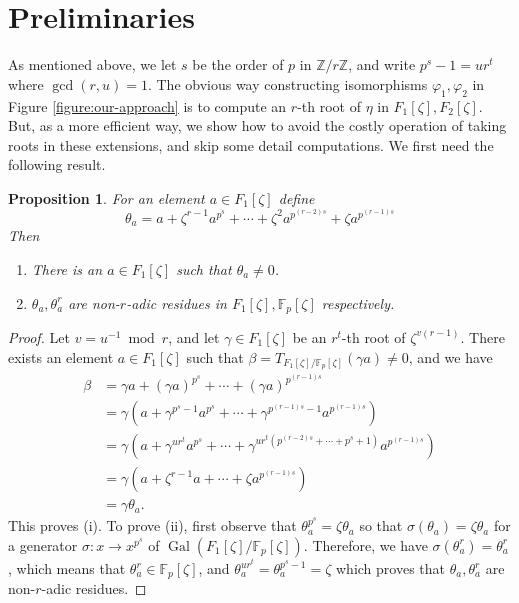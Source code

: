 \documentclass[12pt]{article}
\theoremstyle{plain}
\newtheorem{proposition}[theorem]{Proposition}
\theoremstyle{definition}
\DeclareMathOperator{\gal}{Gal}
\def\F{\mathbb{F}}
\begin{document}

\section{Preliminaries}

As mentioned above, we let $s$ be the order of $p$ in $\mathbb{Z} / r\mathbb{Z}$, and write $p^s - 1 = ur^t$ where $\gcd(r, u) =
1$. The obvious way constructing isomorphisms $\varphi_1, \varphi_2$ in Figure \ref{figure:our-approach} is to compute an $r$-th
root of $\eta$ in $F_1[\zeta], F_2[\zeta]$. But, as a more efficient way, we show how to avoid the costly operation of taking
roots in these extensions, and skip some detail computations. We first need the following result.
\begin{proposition}
\label{proposition:semi-trace}
	For an element $a \in F_1[\zeta]$ define 
	\begin{equation}
	\label{equation:semi-trace} 
		\theta_a = a + \zeta^{r - 1}a^{p^s} + \cdots + \zeta^2a^{p^{(r - 2)s}} + \zeta a^{p^{(r - 1)s}}
	\end{equation}
	Then
	\begin{enumerate}
		\item[\normalfont (i)] There is an $a \in F_1[\zeta]$ such that $\theta_a \ne 0$.
		\item[\normalfont (ii)] $\theta_a, \theta_a^r$ are non-$r$-adic residues in $F_1[\zeta], \F_p[\zeta]$ respectively.
	\end{enumerate}
\end{proposition}
\begin{proof}
	Let $v = u^{-1} \bmod r$, and let $\gamma \in F_1[\zeta]$ be an $r^t$-th root of $\zeta^{v(r - 1)}$. There exists an element $a
\in F_1[\zeta]$ such that $\beta = T_{F_1[\zeta] / \F_p[\zeta]}(\gamma a) \ne 0$, and we have
	\begin{equation}
	\label{equation:trace}
		\begin{aligned}
			\beta 
			& = \gamma a + (\gamma a)^{p^s} + \cdots + (\gamma a)^{p^{(r - 1)s}} \\
			& = \gamma (a + \gamma^{p^s - 1}a^{p^s} + \cdots + \gamma^{p^{(r - 1)s} - 1}a^{p^{(r - 1)s}}) \\
			& = \gamma (a + \gamma^{ur^t}a^{p^s} + \cdots + \gamma^{ur^t(p^{(r - 2)s} + \cdots + p^s + 1)}a^{p^{(r - 1)s}}) \\
			& = \gamma (a + \zeta^{r - 1}a + \cdots + \zeta a^{p^{(r - 1)s}}) \\
			& = \gamma \theta_a.
		\end{aligned}
	\end{equation}
	This proves (i). To prove (ii), first observe that $\theta_a^{p^s} = \zeta\theta_a$ so that $\sigma(\theta_a) = \zeta\theta_a$
for a generator $\sigma: x \to x^{p^s}$ of $\gal(F_1[\zeta] / \F_p[\zeta])$. Therefore, we have $\sigma(\theta_a^r) = \theta_a^r$,
which means that $\theta_a^r \in \F_p[\zeta]$, and $\theta_a^{ur^t} = \theta_a^{p^s - 1} = \zeta$ which proves that $\theta_a,
\theta_a^r$ are non-$r$-adic residues.
\end{proof}
\end{document}
